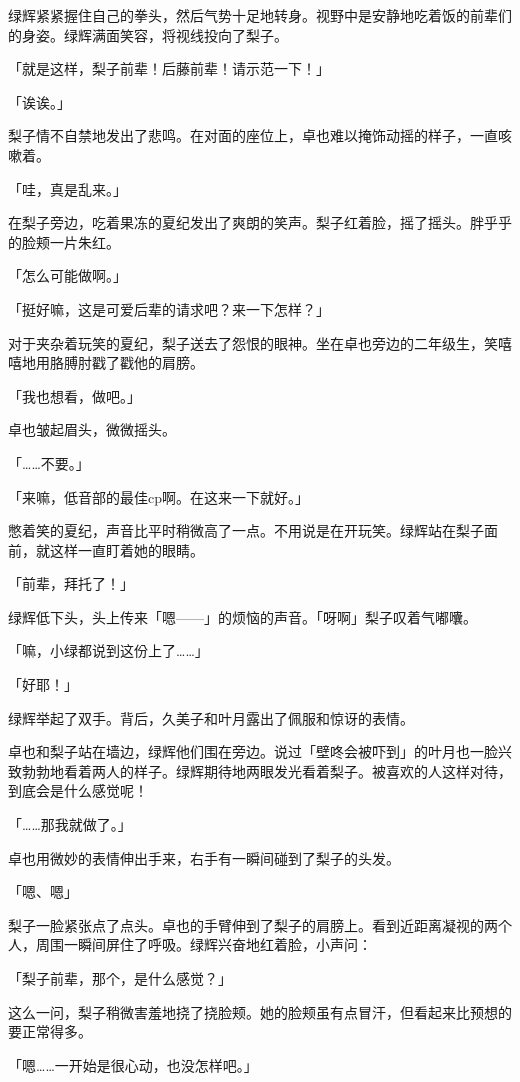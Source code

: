 \documentclass[UTF8]{ctexart}
\begin{document}
    绿辉紧紧握住自己的拳头，然后气势十足地转身。视野中是安静地吃着饭的前辈们的身姿。绿辉满面笑容，将视线投向了梨子。

    「就是这样，梨子前辈！后藤前辈！请示范一下！」

    「诶诶。」

    梨子情不自禁地发出了悲鸣。在对面的座位上，卓也难以掩饰动摇的样子，一直咳嗽着。

    「哇，真是乱来。」

    在梨子旁边，吃着果冻的夏纪发出了爽朗的笑声。梨子红着脸，摇了摇头。胖乎乎的脸颊一片朱红。

    「怎么可能做啊。」

    「挺好嘛，这是可爱后辈的请求吧？来一下怎样？」

    对于夹杂着玩笑的夏纪，梨子送去了怨恨的眼神。坐在卓也旁边的二年级生，笑嘻嘻地用胳膊肘戳了戳他的肩膀。

    「我也想看，做吧。」

    卓也皱起眉头，微微摇头。

    「……不要。」

    「来嘛，低音部的最佳cp啊。在这来一下就好。」

    憋着笑的夏纪，声音比平时稍微高了一点。不用说是在开玩笑。绿辉站在梨子面前，就这样一直盯着她的眼睛。

    「前辈，拜托了！」

    绿辉低下头，头上传来「嗯——」的烦恼的声音。「呀啊」梨子叹着气嘟囔。

    「嘛，小绿都说到这份上了……」

    「好耶！」

    绿辉举起了双手。背后，久美子和叶月露出了佩服和惊讶的表情。

    卓也和梨子站在墙边，绿辉他们围在旁边。说过「壁咚会被吓到」的叶月也一脸兴致勃勃地看着两人的样子。绿辉期待地两眼发光看着梨子。被喜欢的人这样对待，到底会是什么感觉呢！

    「……那我就做了。」

    卓也用微妙的表情伸出手来，右手有一瞬间碰到了梨子的头发。

    「嗯、嗯」

    梨子一脸紧张点了点头。卓也的手臂伸到了梨子的肩膀上。看到近距离凝视的两个人，周围一瞬间屏住了呼吸。绿辉兴奋地红着脸，小声问：

    「梨子前辈，那个，是什么感觉？」

    这么一问，梨子稍微害羞地挠了挠脸颊。她的脸颊虽有点冒汗，但看起来比预想的要正常得多。

    「嗯……一开始是很心动，也没怎样吧。」
\end{document}
